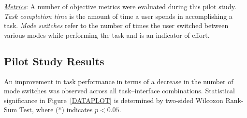 \documentclass[conference]{IEEEtran}
\begin{document}
\noindent\underline{\textit{Metrics}}: A number of objective metrics were evaluated during this pilot study. \textit{Task completion time} is the amount of time a user spends in accomplishing a task. \textit{Mode switches} refer to the number of times the user switched between various modes while performing the task and is an indicator of effort. 


\subsection{Pilot Study Results}\label{RES}
An improvement in task performance in terms of a decrease in the number of mode switches was observed across all task--interface combinations. Statistical significance in Figure~\ref{DATAPLOT} is determined by two-sided Wilcoxon Rank-Sum Test, where (*) indicates $p < 0.05$.
\end{document}
